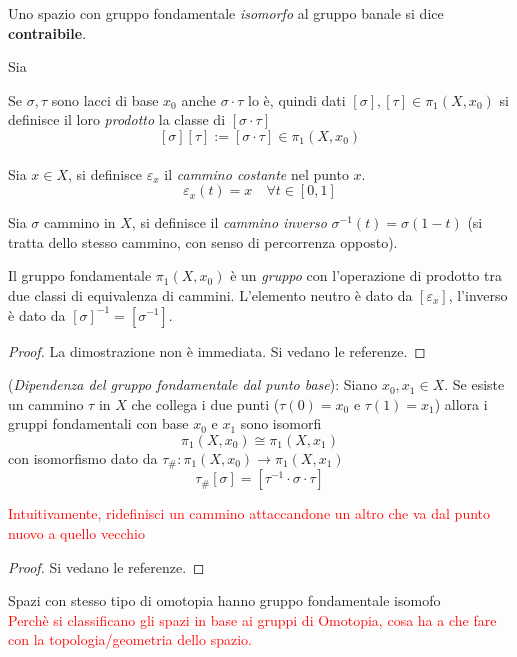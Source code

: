 \begin{definition}
   Uno spazio con gruppo fondamentale \emph{isomorfo} al gruppo banale si dice
   \textbf{contraibile}.
\end{definition}

\begin{definition}
   Sia
\end{definition}

Se $\sigma,\tau$ sono lacci di base $x_0$ anche $\sigma \cdot \tau$ lo è, quindi
dati $[\sigma],[\tau] \in \pi_1(X,x_0)$ si definisce il loro \emph{prodotto}
la classe di $[\sigma \cdot \tau]$
$$ [\sigma][\tau] := [\sigma\cdot\tau] \in \pi_1(X,x_0) $$\\

Sia $x \in X$, si definisce $\varepsilon_x$ il \emph{cammino costante} nel punto $x$.
$$\varepsilon_x(t) = x \quad \forall t \in[0,1]$$

Sia $\sigma$ cammino in $X$, si definisce il \emph{cammino inverso}
$\sigma^{-1}(t) = \sigma(1-t)$ (si tratta dello stesso cammino, con senso
di percorrenza opposto).

\begin{proposition}
   Il gruppo fondamentale $\pi_1(X,x_0)$ è un \emph{gruppo} con l'operazione di
   prodotto tra due classi di equivalenza di cammini.
   L'elemento neutro è dato da $[\varepsilon_x]$,
   l'inverso è dato da $[\sigma]^{-1} = [\sigma^{-1}]$.
\end{proposition}
\begin{proof}
   La dimostrazione non è immediata. Si vedano le referenze.
\end{proof}

\begin{proposition}(\emph{Dipendenza del gruppo fondamentale dal punto base}):
   Siano $x_0, x_1 \in X$. Se esiste un cammino $\tau$ in $X$ che collega i due
   punti ($\tau(0)=x_0$ e $\tau(1)=x_1$) allora i gruppi fondamentali con base
   $x_0$ e $x_1$ sono isomorfi
      $$ \pi_1(X,x_0) \cong \pi_1(X,x_1) $$
   con isomorfismo dato da $\tau_\# : \pi_1(X,x_0) \to \pi_1(X,x_1)$
      $$  \tau_\# [\sigma] = [\tau^{-1} \cdot \sigma \cdot \tau] $$
\end{proposition}
\textcolor{red}{Intuitivamente, ridefinisci un cammino attaccandone un altro che
va dal punto nuovo a quello vecchio}
\begin{proof} Si vedano le referenze. \end{proof}


Spazi con stesso tipo di omotopia hanno gruppo fondamentale isomofo\\
\textcolor{red}{Perchè si classificano gli spazi in base ai gruppi di Omotopia,
cosa ha a che fare con la topologia/geometria dello spazio.}\\

